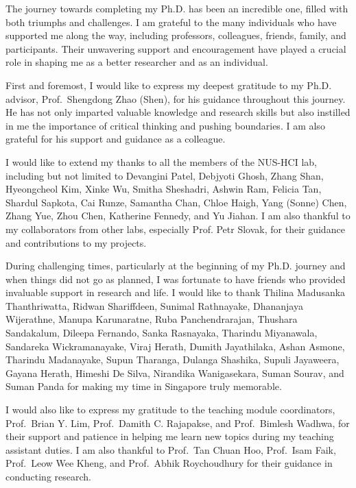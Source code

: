 \begin{acknowledgments}

The journey towards completing my Ph.D. has been an incredible one, filled with both triumphs and challenges. I am grateful to the many individuals who have supported me along the way, including professors, colleagues, friends, family, and participants. Their unwavering support and encouragement have played a crucial role in shaping me as a better researcher and as an individual.

First and foremost, I would like to express my deepest gratitude to my Ph.D. advisor, Prof.~Shengdong Zhao (Shen), for his guidance throughout this journey. He has not only imparted valuable knowledge and research skills but also instilled in me the importance of critical thinking and pushing boundaries. I am also grateful for his support and guidance as a colleague. 

I would like to extend my thanks to all the members of the NUS-HCI lab, including but not limited to Devangini Patel, Debjyoti Ghosh, Zhang Shan, Hyeongcheol Kim, Xinke Wu, Smitha Sheshadri, Ashwin Ram, Felicia Tan, Shardul Sapkota, Cai Runze, Samantha Chan, Chloe Haigh, Yang (Sonne) Chen, Zhang Yue, Zhou Chen, Katherine Fennedy, and Yu Jiahan. I am also thankful to my collaborators from other labs, especially Prof. Petr Slovak, for their guidance and contributions to my projects.

During challenging times, particularly at the beginning of my Ph.D. journey and when things did not go as planned, I was fortunate to have friends who provided invaluable support in research and life. I would like to thank Thilina Madusanka Thanthriwatta, Ridwan Shariffdeen, Sunimal Rathnayake, Dhananjaya Wijerathne, Manupa Karunaratne, Ruba Panchendrarajan, Thushara Sandakalum, Dileepa Fernando, Sanka Rasnayaka, Tharindu Miyanawala, Sandareka Wickramanayake, Viraj Herath, Dumith Jayathilaka, Ashan Asmone, Tharindu Madanayake, Supun Tharanga, Dulanga Shashika, Supuli Jayaweera, Gayana Herath, Himeshi De Silva, Nirandika Wanigasekara, Suman Sourav, and Suman Panda for making my time in Singapore truly memorable.


I would also like to express my gratitude to the teaching module coordinators, Prof.~Brian Y. Lim, Prof.~Damith C. Rajapakse, and Prof.~Bimlesh Wadhwa, for their support and patience in helping me learn new topics during my teaching assistant duties. I am also thankful to Prof.~Tan Chuan Hoo, Prof.~Isam Faik, Prof.~Leow Wee Kheng, and Prof.~Abhik Roychoudhury for their guidance in conducting research.


\end{acknowledgments}
